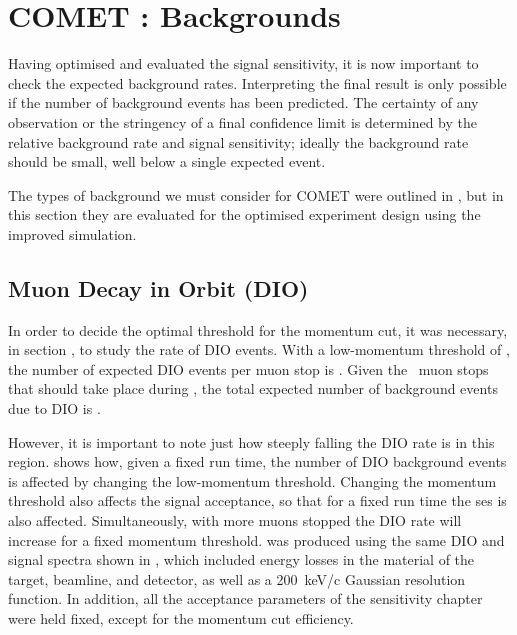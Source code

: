 
\chapter{COMET \phaseII: Backgrounds}
Having optimised and evaluated the signal sensitivity, it is now important to check the expected background rates.
Interpreting the final result is only possible if the number of background events has been predicted.
The certainty of any observation or the stringency of a final confidence limit is determined by the relative background rate and signal sensitivity; ideally the background rate should be small, well below a single expected event.

The types of background we must consider for COMET were outlined in , but in this section they are evaluated for the optimised experiment design using the improved simulation.

\FigDIOBackground
\section{Muon Decay in Orbit (\acs{DIO})}
In order to decide the optimal threshold for the momentum cut, it was necessary, in section , to study the rate of \ac{DIO} events.
With a low-momentum threshold of \VarMomThreshold, the number of expected DIO events per muon stop is \VarDIOPerMuStop{}.
Given the \VarTotalMuStops~muon stops that should take place during \phaseII, the total expected number of background events due to DIO is \VarDIOTotal.

However, it is important to note just how steeply falling the DIO rate is in this region.
 shows how, given a fixed run time, the number of DIO background events is affected by changing the low-momentum threshold.
Changing the momentum threshold also affects the signal acceptance, so that for a fixed run time the \ac{ses} is also affected.
Simultaneously, with more muons stopped the \ac{DIO} rate will increase for a fixed momentum threshold.
 was produced using the same DIO and signal spectra shown in , which included energy losses in the material of the target, beamline, and detector, as well as a 200~keV/c Gaussian resolution function. 
In addition, all the acceptance parameters of the sensitivity chapter were held fixed, except for the momentum cut efficiency.

